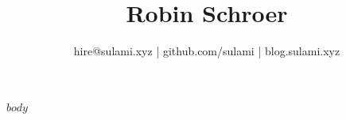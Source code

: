 \documentclass[a4paper,10pt]{scrartcl}
\title{\bfseries Robin Schroer}
\author{hire@sulami.xyz | github.com/sulami | blog.sulami.xyz}
\date{}
\begin{document}
\maketitle

$body$
\end{document}
